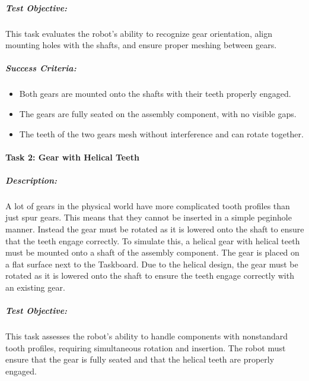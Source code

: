 \documentclass[letterpaper,10pt,english]{sphinxmanual}
\begin{document}
\subparagraph{Test Objective:}
\label{\detokenize{robotic_instructions_gear_tasks:test-objective}}
\sphinxAtStartPar
This task evaluates the robot’s ability to recognize gear orientation, align mounting holes with the shafts, and ensure proper meshing between gears.


\subparagraph{Success Criteria:}
\label{\detokenize{robotic_instructions_gear_tasks:success-criteria}}\begin{itemize}
\item {} 
\sphinxAtStartPar
Both gears are mounted onto the shafts with their teeth properly engaged.

\item {} 
\sphinxAtStartPar
The gears are fully seated on the assembly component, with no visible gaps.

\item {} 
\sphinxAtStartPar
The teeth of the two gears mesh without interference and can rotate together.

\end{itemize}


\paragraph{Task 2: Gear with Helical Teeth}
\label{\detokenize{robotic_instructions_gear_tasks:task-2-gear-with-helical-teeth}}

\subparagraph{Description:}
\label{\detokenize{robotic_instructions_gear_tasks:id1}}
\sphinxAtStartPar
A lot of gears in the physical world have more complicated tooth profiles than just spur gears.
This means that they cannot be inserted in a simple peg\sphinxhyphen{}in\sphinxhyphen{}hole manner.
Instead the gear must be rotated as it is lowered onto the shaft to ensure that the teeth engage correctly.
To simulate this, a helical gear with helical teeth must be mounted onto a shaft of the assembly component.
The gear is placed on a flat surface next to the Taskboard.
Due to the helical design, the gear must be rotated as it is lowered onto the shaft to ensure the teeth engage correctly with an existing gear.


\subparagraph{Test Objective:}
\label{\detokenize{robotic_instructions_gear_tasks:id2}}
\sphinxAtStartPar
This task assesses the robot’s ability to handle components with non\sphinxhyphen{}standard tooth profiles,
requiring simultaneous rotation and insertion. The robot must ensure that the gear is fully seated and that the helical teeth are properly engaged.
\end{document}
